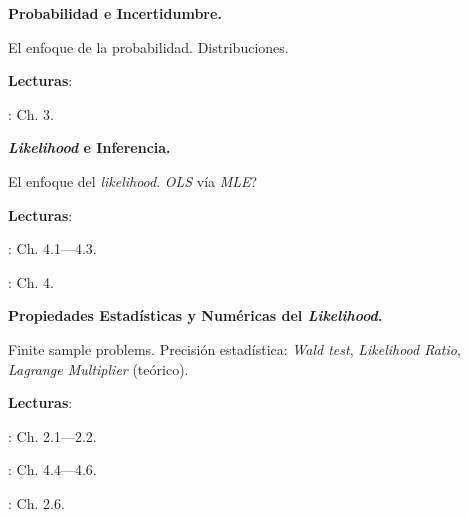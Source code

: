 \documentclass[letterpaper]{article}
\renewenvironment{itemize}{
  \begin{list}{}{
    \setlength{\leftmargin}{1.5em}
  }
}{
  \end{list}
}
\begin{document}
\begin{enumerate}[label=\roman*.]
      \begin{itemize} 
        \item[8.] {\bf Probabilidad e Incertidumbre.}
        \begin{itemize} 
          \item[$\circ$] El enfoque de la probabilidad. Distribuciones. 
          \item[$\circ$] {\bf Lecturas}: 
            \begin{itemize} 
              \item[$\diamond$] \textcite{King1998}: Ch. 3.
            \end{itemize}
        \end{itemize}
      \end{itemize}


      \begin{itemize} 
        \item[9.] {\bf \emph{Likelihood} e Inferencia.}
        \begin{itemize} 
          \item[$\circ$] El enfoque del \emph{likelihood}. \emph{OLS} v\'ia \emph{MLE}?
          \item[$\circ$] {\bf Lecturas}: 
            \begin{itemize} 
              \item[$\diamond$] \textcite{King1998}: Ch. 4.1---4.3. 
              \item[$\diamond$] \textcite{Ward2018}: Ch. 4.
            \end{itemize}
        \end{itemize}
      \end{itemize}


      \begin{itemize} 
        \item[10.] {\bf Propiedades Estad\'isticas y Num\'ericas del \emph{Likelihood}.}
        \begin{itemize} 
          \item[$\circ$] Finite sample problems. Precisi\'on estad\'istica: \emph{Wald test}, \emph{Likelihood Ratio}, \emph{Lagrange Multiplier} (te\'orico).
          \item[$\circ$] {\bf Lecturas}: 
            \begin{itemize} 
              \item[$\diamond$] \textcite{Ward2018}: Ch. 2.1---2.2. 
              \item[$\diamond$] \textcite{King1998}: Ch. 4.4---4.6.
              \item[$\diamond$] \textcite{Long2001}: Ch. 2.6.
            \end{itemize}
        \end{itemize}
      \end{itemize}


\end{enumerate}
\end{document}
